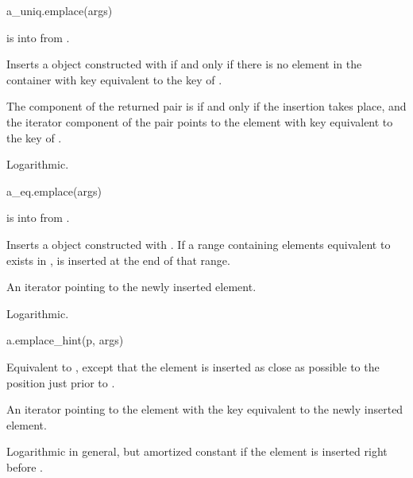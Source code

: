 %
\begin{itemdecl}
a_uniq.emplace(args)
\end{itemdecl}

\begin{itemdescr}
\pnum
\result
{}

\pnum
\expects
{} is
 into  from .

\pnum
\effects
Inserts a  object 
constructed with 
if and only if there is no element in the container
with key equivalent to the key of .

\pnum
\returns
The  component of the returned pair is 
if and only if the insertion takes place, and
the iterator component of the pair points to
the element with key equivalent to the key of .

\pnum
\complexity
Logarithmic.
\end{itemdescr}

%
\begin{itemdecl}
a_eq.emplace(args)
\end{itemdecl}

\begin{itemdescr}
\pnum
\result
{}

\pnum
\expects
{} is
 into  from .

\pnum
\effects
Inserts a  object 
constructed with .
If a range containing elements equivalent to  exists in ,
 is inserted at the end of that range.

\pnum
\returns
An iterator pointing to the newly inserted element.

\pnum
\complexity
Logarithmic.
\end{itemdescr}

%
\begin{itemdecl}
a.emplace_hint(p, args)
\end{itemdecl}

\begin{itemdescr}
\pnum
\result
{}

\pnum
\effects
Equivalent to ,
except that the element is inserted as close as possible to
the position just prior to .

\pnum
\returns
An iterator pointing to the element
with the key equivalent to the newly inserted element.

\pnum
\complexity
Logarithmic in general, but
amortized constant if the element is inserted right before .
\end{itemdescr}

